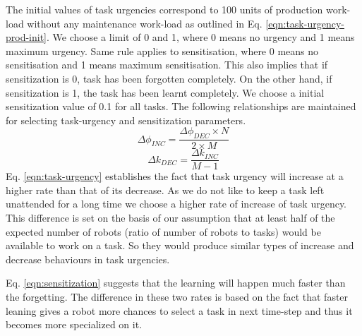 \documentclass[final,5p,times,twocolumn]{elsarticle}
\begin{document}
The initial values of task urgencies correspond to 100 units of production work-load without any maintenance work-load as outlined in Eq. \ref{eqn:task-urgency-prod-init}. We choose a limit of 0 and 1, where 0 means no urgency and 1 means maximum urgency. Same rule applies to sensitisation, where 0 means no sensitisation and 1 means maximum sensitisation. This also implies that if sensitization is 0, task has been forgotten completely. On the other hand, if sensitization is 1, the task has been learnt completely. We choose a initial sensitization value of 0.1 for all tasks. The following relationships are maintained for selecting task-urgency and sensitization parameters.
\begin{equation}
\Delta\phi_{INC} = \frac{\Delta\phi_{DEC} \times N}{2 \times M}
\label{eqn:task-urgency}
\end{equation}
%
\begin{equation}
\Delta k_{DEC} = \frac{\Delta k_{INC}} {M - 1} 
\label{eqn:sensitization}
\end{equation}
%
Eq. \ref{eqn:task-urgency} establishes the fact that task urgency will increase at a higher rate than that of its decrease. As we do not like to keep a task left unattended for a long time we choose a higher rate of increase of task urgency. This difference is set on the basis of our assumption that at least half of the expected number of robots (ratio of number of robots to tasks) would be available to work on a task. So they would produce similar types of increase and decrease behaviours in task urgencies.

Eq. \ref{eqn:sensitization} suggests that the learning will happen much faster than the forgetting. The difference in these two rates is based on the fact that faster leaning gives a robot more chances to select a task in next time-step and thus it becomes more specialized on it.
\end{document}
